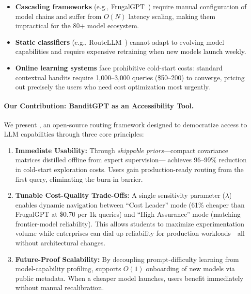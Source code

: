 \begin{itemize}[leftmargin=*]
    \item \textbf{Cascading frameworks} (e.g., FrugalGPT~\cite{chen2023frugalgpt}) require manual configuration of model chains and suffer from $O(N)$ latency scaling, making them impractical for the 80+ model ecosystem.
    \item \textbf{Static classifiers} (e.g., RouteLLM~\cite{ong2024routellm}) cannot adapt to evolving model capabilities and require expensive retraining when new models launch weekly.
    \item \textbf{Online learning systems} face prohibitive cold-start costs: standard contextual bandits require 1,000--3,000 queries (\$50--200) to converge, pricing out precisely the users who need cost optimization most urgently.
\end{itemize}

\paragraph{Our Contribution: BanditGPT as an Accessibility Tool.} We present \ours{}, an open-source routing framework designed to democratize access to LLM capabilities through three core principles:

\begin{enumerate}[leftmargin=*]
    \item \textbf{Immediate Usability:} Through \emph{shippable priors}---compact covariance matrices distilled offline from expert supervision---\ours{} achieves 96--99\% reduction in cold-start exploration costs. Users gain production-ready routing from the first query, eliminating the burn-in barrier.
    \item \textbf{Tunable Cost-Quality Trade-Offs:} A single sensitivity parameter ($\lambda$) enables dynamic navigation between ``Cost Leader'' mode (61\% cheaper than FrugalGPT at \$0.70 per 1k queries) and ``High Assurance'' mode (matching frontier-model reliability). This allows students to maximize experimentation volume while enterprises can dial up reliability for production workloads---all without architectural changes.
    \item \textbf{Future-Proof Scalability:} By decoupling prompt-difficulty learning from model-capability profiling, \ours{} supports $O(1)$ onboarding of new models via public metadata. When a cheaper model launches, users benefit immediately without manual recalibration.
\end{enumerate}

